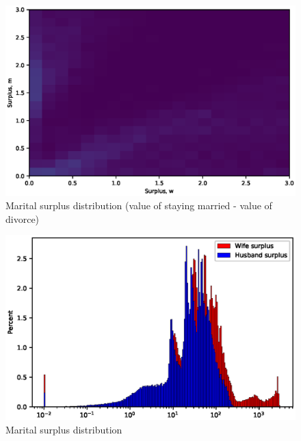\documentclass[]{article}
\begin{document}

\begin{figure}[H]
	\centering
	\includegraphics[width=\textwidth]{surplus_dist.eps} 
	\caption{Marital surplus distribution (value of staying married - value of divorce)}
	\label{fig:surplus dist}
\end{figure}



\begin{figure}[H]
	\centering
	\includegraphics[width=\textwidth]{surplus_dist_2d.eps} 
	\caption{Marital surplus distribution}
	\label{fig:surplus dist_2d}
\end{figure}
\end{document}
